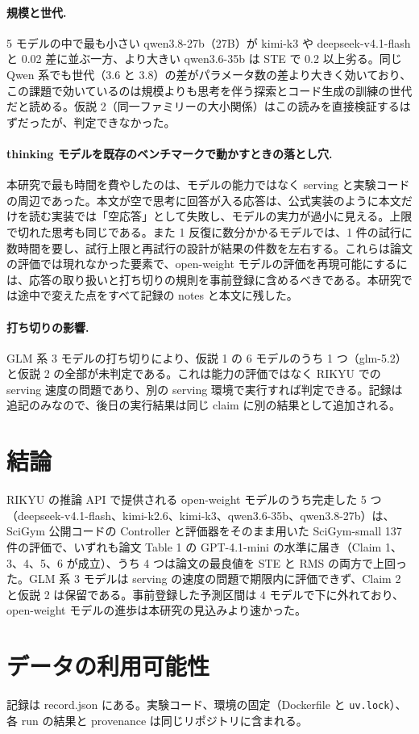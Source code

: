 \documentclass{article}
\providecommand{\airasrecordlink}[1]{#1}
\begin{document}
\paragraph{規模と世代.}
5 モデルの中で最も小さい qwen3.8-27b（27B）が kimi-k3 や deepseek-v4.1-flash と 0.02 差に並ぶ一方、より大きい qwen3.6-35b は STE で 0.2 以上劣る。同じ Qwen 系でも世代（3.6 と 3.8）の差がパラメータ数の差より大きく効いており、この課題で効いているのは規模よりも思考を伴う探索とコード生成の訓練の世代だと読める。仮説 2（同一ファミリーの大小関係）はこの読みを直接検証するはずだったが、判定できなかった。

\paragraph{thinking モデルを既存のベンチマークで動かすときの落とし穴.}
本研究で最も時間を費やしたのは、モデルの能力ではなく serving と実験コードの周辺であった。本文が空で思考に回答が入る応答は、公式実装のように本文だけを読む実装では「空応答」として失敗し、モデルの実力が過小に見える。上限で切れた思考も同じである。また 1 反復に数分かかるモデルでは、1 件の試行に数時間を要し、試行上限と再試行の設計が結果の件数を左右する。これらは論文の評価では現れなかった要素で、open-weight モデルの評価を再現可能にするには、応答の取り扱いと打ち切りの規則を事前登録に含めるべきである。本研究では途中で変えた点をすべて記録の notes と本文に残した。

\paragraph{打ち切りの影響.}
GLM 系 3 モデルの打ち切りにより、仮説 1 の 6 モデルのうち 1 つ（glm-5.2）と仮説 2 の全部が未判定である。これは能力の評価ではなく RIKYU での serving 速度の問題であり、別の serving 環境で実行すれば判定できる。記録は追記のみなので、後日の実行結果は同じ claim に別の結果として追加される。

\section{結論}
\label{sec:conclusion}
RIKYU の推論 API で提供される open-weight モデルのうち完走した 5 つ（deepseek-v4.1-flash、kimi-k2.6、kimi-k3、qwen3.6-35b、qwen3.8-27b）は、SciGym 公開コードの Controller と評価器をそのまま用いた SciGym-small 137 件の評価で、いずれも論文 Table 1 の GPT-4.1-mini の水準に届き（Claim 1、3、4、5、6 が成立）、うち 4 つは論文の最良値を STE と RMS の両方で上回った。GLM 系 3 モデルは serving の速度の問題で期限内に評価できず、Claim 2 と仮説 2 は保留である。事前登録した予測区間は 4 モデルで下に外れており、open-weight モデルの進歩は本研究の見込みより速かった。

\section*{データの利用可能性}
記録は \airasrecordlink{record.json} にある。実験コード、環境の固定（Dockerfile と \texttt{uv.lock}）、各 run の結果と provenance は同じリポジトリに含まれる。



\end{document}
